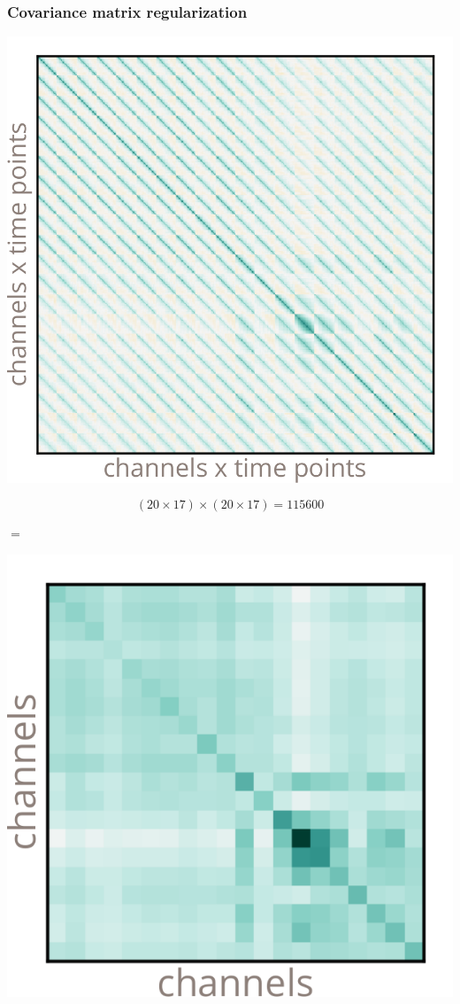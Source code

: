 \documentclass{kul-ulille-beamer}
\begin{document}
\begin{frame}[c]
  \frametitle{Covariance matrix regularization \\
  {\tiny\cite{VanDenKerchove2022}}}
  \begin{minipage}[c]{.3\textwidth}
  \includegraphics[width=\textwidth]{figures/decode/emp_cov.pdf}

    \tiny
    $$(20 \times 17) \times (20 \times 17) = 115600 $$
  \end{minipage}
  $=$\hspace{.3em}
  \begin{minipage}[c]{.3\textwidth}
    \begin{minipage}[c]{.4\textwidth}
      \vspace{2.1em}
      \includegraphics[width=\textwidth]{figures/decode/sp_cov_2.pdf}


\end{minipage}
\end{minipage}
\end{frame}
\end{document}
